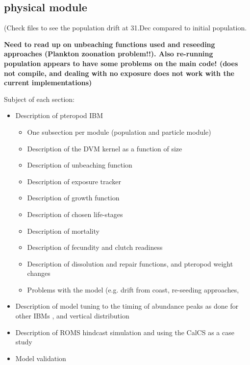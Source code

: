 \subsection{physical module}




(Check files to see the population drift at 31.Dec compared to initial population.

\textbf{
Need to read up on unbeaching functions used and reseeding approaches (Plankton zoonation problem!!). Also re-running population appears to have some problems on the main code! (does not compile, and dealing with no exposure does not work with the current implementations)}



Subject of each section:
\begin{itemize}
    \item Description of pteropod IBM
        \begin{itemize}
            \item One subsection per module (population and particle module) \citep{Erguler2018Modules}
            \item Description of the DVM kernel as a function of size \citep{Bianchi2013ImportanceDVM,Bednarsek2015VerticalDistribution,Murphy2016UpwardSwimming,Chang2012SwimmingSpeedSize,Byrne1984SettlingSpeed,Bergan2017SwimmingSinkingSpeeds}
            \item Description of unbeaching function \citep{Delandmeter2019Unbeaching}
            \item Description of exposure tracker \citep{Bednarsek2017ExposureHistory}
            \item Description of growth function \citep{Wang2017Lifecycle,Somers1988}
            \item Description of chosen life-stages \citep{Thabet2015Lifestages,Howes2014Lab}
            \item Description of mortality \citep{Bednarsek2016CumulativeEffects}
            \item Description of fecundity and clutch readiness \citep{Paranjape1968egg,Manno2016EggsAcidification,Bednarsek2016CumulativeEffects}
            \item Description of dissolution and repair functions, and pteropod weight changes \citep{Bednarsek2014CalcificationDissolution,Comeau2010RepairRates}
            \item Problems with the model (e.g. drift from coast, re-seeding approaches, 
        \end{itemize}
    \item Description of model tuning to the timing of abundance peaks as done for other IBMs \citep[e.g. ][]{Miller1998CalanusIBM}, and vertical distribution
    \item Description of ROMS hindcast simulation and using the CalCS as a case study
    \item Model validation
    

\end{itemize}
